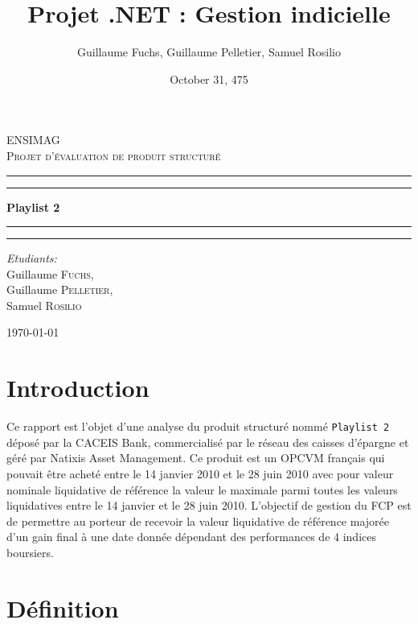\documentclass[french,12pt,a4paper]{article}
\title{Projet .NET : Gestion indicielle}
\date{October 31, 475}
\author{Guillaume Fuchs, Guillaume Pelletier, Samuel Rosilio}
\begin{document}
\begin{titlepage}
\begin{center}

\textsc{\LARGE ENSIMAG}\\[1.5cm]

\textsc{\Large Projet d'évaluation de produit structuré}\\[0.5cm]

 \hrule
 \hrule 

\vspace{7mm}
{ \huge \bfseries Playlist 2  }

\vspace{7mm}
\hrule
\hrule

\vspace{7mm}
\begin{minipage}{0.4\textwidth}
\begin{flushleft} \large
\emph{Etudiants:}\\
Guillaume \textsc{Fuchs},\\
Guillaume \textsc{Pelletier},\\
Samuel \textsc{Rosilio}
\end{flushleft}
\end{minipage}

\vfill

{\large \today}

\end{center}
\end{titlepage}
\tableofcontents
\newpage

\section{Introduction}

Ce rapport est l'objet d'une analyse du produit structuré nommé \lstinline!Playlist 2! déposé par  la CACEIS Bank, commercialisé par le réseau des caisses d'épargne et géré par Natixis Asset Management.
Ce produit est un OPCVM français qui pouvait être acheté entre le 14 janvier 2010 et le 28 juin 2010 avec pour valeur nominale liquidative de référence la valeur le maximale parmi toutes les valeurs liquidatives entre le 14 janvier et le 28 juin 2010. L'objectif de gestion du FCP est de permettre au porteur de recevoir la valeur liquidative de référence majorée d'un gain final à une date donnée dépendant des performances de 4 indices boursiers. 


\section{Définition}
\end{document}
